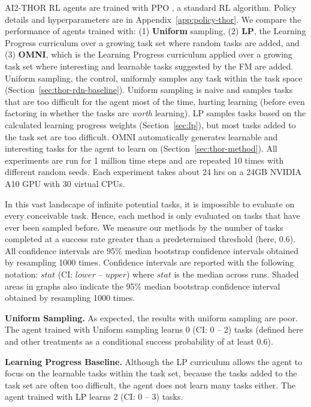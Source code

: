 \documentclass{article} %
\begin{document}
AI2-THOR RL agents are trained with PPO \citep{ppo}, a standard RL algorithm. Policy details and hyperparameters are in Appendix~\ref{app:policy-thor}. We compare the performance of agents trained with: (1) \textbf{Uniform} sampling, (2) \textbf{LP}, the Learning Progress curriculum over a growing task set where random tasks are added, and (3) \textbf{OMNI}, which is the Learning Progress curriculum applied over a growing task set where interesting and learnable tasks suggested by the FM are added. Uniform sampling, the control, uniformly samples any task within the task space (Section~\ref{sec:thor-rdn-baseline}). Uniform sampling is naive and samples tasks that are too difficult for the agent most of the time, hurting learning (before even factoring in whether the tasks are \emph{worth} learning). LP samples tasks based on the calculated learning progress weights (Section~\ref{sec:lp}), but most tasks added to the task set are too difficult. OMNI automatically generates learnable and interesting tasks for the agent to learn on (Section~\ref{sec:thor-method}). All experiments are run for 1 million time steps and are repeated 10 times with different random seeds. Each experiment takes about 24 hrs on a 24GB NVIDIA A10 GPU with 30 virtual CPUs.

In this vast landscape of infinite potential tasks, it is impossible to evaluate on every conceivable task. Hence, each method is only evaluated on tasks that have ever been sampled before. We measure our methods by the number of tasks completed at a success rate greater than a predetermined threshold (here, 0.6). All confidence intervals are 95\% median bootstrap confidence intervals obtained by resampling 1000 times. Confidence intervals are reported with the following notation: $stat$ (CI: $lower$ -- $upper$) where $stat$ is the median across runs. Shaded areas in graphs also indicate the 95\% median bootstrap confidence interval obtained by resampling 1000 times.

\textbf{Uniform Sampling.} As expected, the results with uniform sampling are poor. The agent trained with Uniform sampling learns 0 (CI: 0 -- 2) tasks (defined here and other treatments as a conditional success probability of at least 0.6).

\textbf{Learning Progress Baseline.} Although the LP curriculum allows the agent to focus on the learnable tasks within the task set, because the tasks added to the task set are often too difficult, the agent does not learn many tasks either. The agent trained with LP learns 2 (CI: 0 -- 3) tasks.
\end{document}
